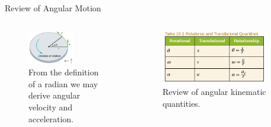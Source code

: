 \documentclass{beamer}
\begin{document}
\begin{frame}{Review of Angular Motion}
\begin{columns}[T]
\begin{column}{0.5\textwidth}
\begin{figure}
\centering
\includegraphics[width=0.6\textwidth]{figures/angle.png}
\caption{\label{fig:angle} From the definition of a radian we may derive angular velocity and acceleration.}
\end{figure}
\end{column}
\begin{column}{0.5\textwidth}
\begin{figure}
\centering
\includegraphics[width=0.89\textwidth]{figures/angle2.png}
\caption{\label{fig:angle2} Review of angular kinematic quantities.}
\end{figure}
\end{column}
\end{columns}
\end{frame}
\end{document}
